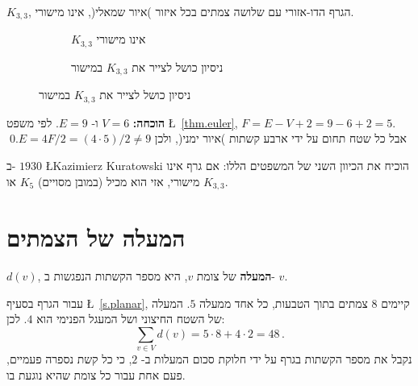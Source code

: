 \begin{theorem}
$K_{3,3}$,
הגרף הדו-אזורי עם שלושה צמתים בכל איזור )איור שמאלי(,
אינו מישורי.
\end{theorem}

\begin{figure}[bt]
\begin{center}
\begin{subfigure}{.4\textwidth}
\caption{$K_{3,3}$ אינו מישורי}\label{f.five-k33}
\end{subfigure}
\hspace{3em}
\begin{subfigure}{.4\textwidth}
\caption{ניסיון כושל לצייר את
$K_{3,3}$
במישור}
\label{f.five-k33-failed}
\end{subfigure}
\end{center}
\end{figure}

\textbf{הוכחה:}
$V=6$
ו-%
$E=9$.
לפי משפט
\L{~\ref{thm.euler}},
$F=E-V+2=9-6+2=5$.
אבל כל שטח תחום על ידי ארבע קשתות )איור ימני(, ולכן
$E=4F/2=(4\cdot 5)/2\neq 9$.\qed

ב-%
$1930$
\L{Kazimierz Kuratowski}
הוכיח את הכיוון השני של המשפטים הללו: אם גרף אינו מישורי, אזי הוא מכיל (במובן מסויים) 
$K_5$
או
$K_{3,3}$.


\section{המעלה של הצמתים}\label{s.degrees}

\begin{definition}
$d(v)$,
\textbf{המעלה}
של צומת
$v$,
היא מספר הקשתות הנפגשות ב-%
$v$.
\end{definition}

\begin{example}
עבור הגרף בסעיף
\L{~\ref{s.planar}},
קיימים 
$8$
צמתים בתוך הטבעות, כל אחד ממעלה
$5$.
המעלה של השטח החיצוני ושל המעגל הפנימי הוא 
$4$.
לכן:
\[
\sum_{v\in V} d(v) = 5\cdot 8 + 4\cdot 2=48\,.
\]
נקבל את מספר הקשתות בגרף על ידי חלוקת סכום המעלות ב-%
$2$,
כי כל קשת נספרה פעמיים, פעם אחת עבור כל צומת שהיא נוגעת בו.
\end{example}

